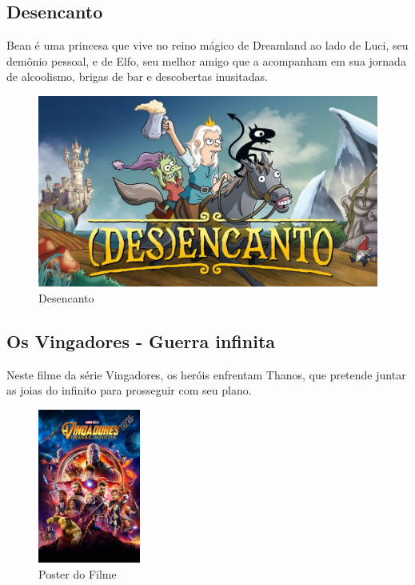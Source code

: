 \subsection{Desencanto}

Bean é uma princesa que vive no reino mágico de Dreamland ao lado de Luci, seu
demônio pessoal, e de Elfo, seu melhor amigo que a acompanham em sua jornada de
alcoolismo, brigas de bar e descobertas inusitadas.



\begin{figure}[!htb] \caption{\label{Desencanto}Desencanto} \begin{center}
\includegraphics[width=\textwidth/2]{imagens/Desencanto.jpg} \end{center}
 \end{figure}

\subsection{Os Vingadores - Guerra infinita}

Neste filme da série Vingadores, os heróis enfrentam Thanos, que pretende juntar
as joias do infinito para prosseguir com seu plano.

\begin{figure}[!htb] \caption{\label{vingadores}Poster do Filme} \begin{center}
\includegraphics[width=0.3\textwidth]{imagens/vingadores.jpeg} \end{center}
 \end{figure}

